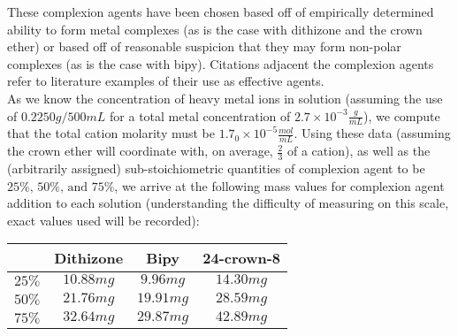 \documentclass[letterpaper,12pt]{article}
\begin{document}
	\indent
	These complexion agents have been chosen based off of empirically determined ability to form metal complexes (as is the case with dithizone and the crown ether) or based off of reasonable suspicion that they may form non-polar complexes (as is the case with bipy). Citations adjacent the complexion agents refer to literature examples of their use as effective agents.
	\\
	\indent
	As we know the concentration of heavy metal ions in solution (assuming the use of $0.2250g/500mL$ for a total metal concentration of $2.7\times 10^{-3}\frac{g}{mL}$), we compute that the total cation molarity must be $1.7_0\times 10^{-5}\frac{mol}{mL}$. Using these data (assuming the crown ether will coordinate with, on average, $\frac{2}{3}$ of a cation)\cite{c3}, as well as the (arbitrarily assigned) sub-stoichiometric quantities of complexion agent to be $25\%\text{, }50\%\text{, and }75\%$, we arrive at the following mass values for complexion agent addition to each solution (understanding the difficulty of measuring on this scale, exact values used will be recorded):
	\begin{center}
		\begin{tabular}[htbp]{r|c|c|c}
			& \textbf{Dithizone} & \textbf{Bipy} & \textbf{24-crown-8}\\
			\hline
			$25\%$ & $10.88mg$ & $9.96mg$ & $14.30mg$\\
			\hline 
			$50\%$ & $21.76mg$ & $19.91mg$ & $28.59mg$\\
			\hline
			$75\%$ & $32.64mg$ & $29.87mg$ & $42.89mg$
		\end{tabular}
	\end{center}
	
\end{document}
